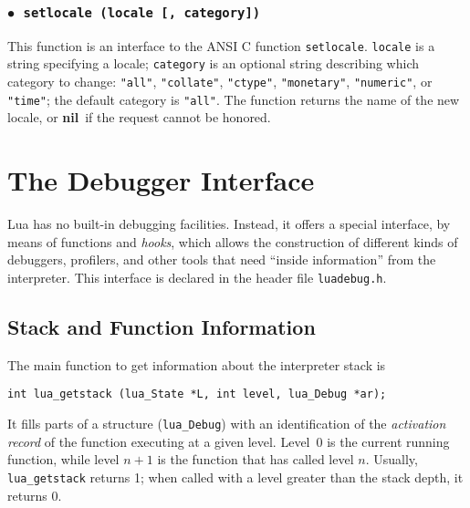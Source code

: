 \documentclass[11pt]{article}
\newcommand{\T}[1]{{\tt #1}}
\newcommand{\Math}[1]{$#1$}
\newcommand{\nil}{{\bf nil}}
\newcommand{\Deffunc}[1]{\index{#1}}
\newcommand{\ff}{$\bullet$\ }
\begin{document}
\subsubsection*{\ff \T{setlocale (locale [, category])}}\Deffunc{setlocale}

This function is an interface to the ANSI C function \verb|setlocale|.
\verb|locale| is a string specifying a locale;
\verb|category| is an optional string describing which category to change:
\verb|"all"|, \verb|"collate"|, \verb|"ctype"|,
\verb|"monetary"|, \verb|"numeric"|, or \verb|"time"|;
the default category is \verb|"all"|.
The function returns the name of the new locale,
or \nil\ if the request cannot be honored.


\section{The Debugger Interface} \label{debugI}

Lua has no built-in debugging facilities.
Instead, it offers a special interface,
by means of functions and \emph{hooks},
which allows the construction of different
kinds of debuggers, profilers, and other tools
that need ``inside information'' from the interpreter.
This interface is declared in the header file \verb|luadebug.h|.

\subsection{Stack and Function Information}

\Deffunc{lua_getstack}
The main function to get information about the interpreter stack is
\begin{verbatim}
int lua_getstack (lua_State *L, int level, lua_Debug *ar);
\end{verbatim}
It fills parts of a structure (\verb|lua_Debug|) with
an identification of the \emph{activation record}
of the function executing at a given level.
Level~0 is the current running function,
while level \Math{n+1} is the function that has called level \Math{n}.
Usually, \verb|lua_getstack| returns 1;
when called with a level greater than the stack depth,
it returns 0.
\end{document}
